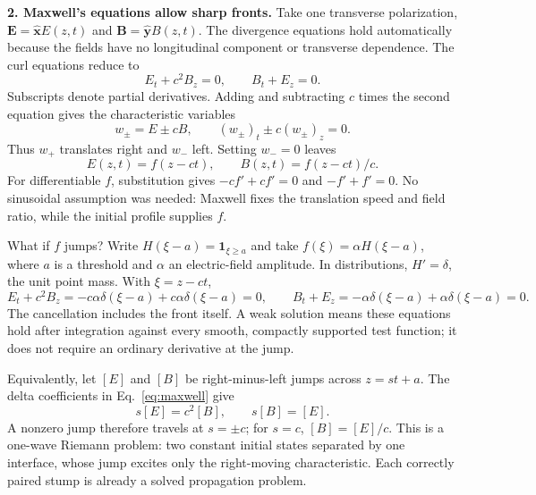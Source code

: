 \documentclass[11pt,letterpaper]{article}
\newcommand{\E}{\mathbf E}
\newcommand{\B}{\mathbf B}
\newcommand{\ind}{\mathbf1}
\begin{document}
\textbf{2. Maxwell's equations allow sharp fronts.}
Take one transverse polarization, $\E=\hat{\mathbf x}E(z,t)$ and
$\B=\hat{\mathbf y}B(z,t)$. The divergence equations hold automatically because
the fields have no longitudinal component or transverse dependence. The curl
equations reduce to
\begin{equation}
 E_t+c^2B_z=0,\qquad B_t+E_z=0.
 \label{eq:maxwell}
\end{equation}
Subscripts denote partial derivatives. Adding and subtracting $c$ times the
second equation gives the characteristic variables
\begin{equation}
 w_\pm=E\pm cB,\qquad (w_\pm)_t\pm c(w_\pm)_z=0.
 \label{eq:characteristics}
\end{equation}
Thus $w_+$ translates right and $w_-$ left. Setting $w_-=0$ leaves
\begin{equation}
 \boxed{E(z,t)=f(z-ct),\qquad B(z,t)=f(z-ct)/c.}
 \label{eq:profile}
\end{equation}
For differentiable $f$, substitution gives $-cf'+cf'=0$ and $-f'+f'=0$.
No sinusoidal assumption was needed: Maxwell fixes the translation speed and
field ratio, while the initial profile supplies $f$.

What if $f$ jumps? Write $H(\xi-a)=\ind_{\xi\ge a}$ and take
$f(\xi)=\alpha H(\xi-a)$, where $a$ is a threshold and $\alpha$ an electric-field
amplitude. In distributions, $H'=\delta$, the unit point mass. With $\xi=z-ct$,
\begin{equation}
 E_t+c^2B_z=-c\alpha\delta(\xi-a)+c\alpha\delta(\xi-a)=0,
 \qquad B_t+E_z=-\alpha\delta(\xi-a)+\alpha\delta(\xi-a)=0.
 \label{eq:weak}
\end{equation}
The cancellation includes the front itself. A weak solution means these equations
hold after integration against every smooth, compactly supported test function;
it does not require an ordinary derivative at the jump.

Equivalently, let $[E]$ and $[B]$ be right-minus-left jumps across $z=st+a$.
The delta coefficients in Eq.~\eqref{eq:maxwell} give
\begin{equation}
 s[E]=c^2[B],\qquad s[B]=[E].
 \label{eq:jump}
\end{equation}
A nonzero jump therefore travels at $s=\pm c$; for $s=c$, $[B]=[E]/c$.
This is a one-wave Riemann problem: two constant initial states separated by
one interface, whose jump excites only the right-moving characteristic.
Each correctly paired stump is already a solved propagation problem.
\end{document}
